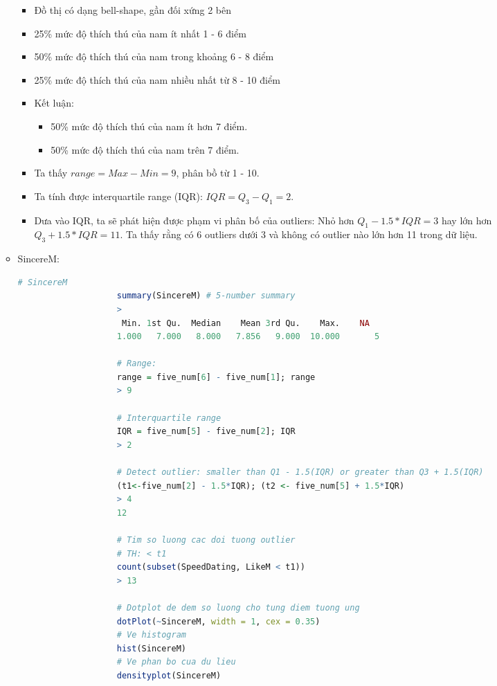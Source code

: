 \documentclass[a4paper,12pt]{article}
\begin{document}
\begin{enumerate}[label = {\alph*)}]
\begin{itemize}
					\begin{itemize}
						\item Đồ thị có dạng bell-shape, gần đối xứng 2 bên
						\item 25\% mức độ thích thú của nam ít nhất 1 - 6 điểm 
						\item 50\% mức độ thích thú của nam trong khoảng 6 - 8 điểm
						\item 25\% mức độ thích thú của nam nhiều nhất từ 8 - 10 điểm
						\item Kết luận:
						\begin{itemize}
							\item 50\% mức độ thích thú của nam ít hơn 7 điểm.
							\item 50\% mức độ thích thú của nam trên 7 điểm.
						\end{itemize}
						\item Ta thấy $range = Max - Min = 9$, phân bồ từ 1 - 10.
						\item Ta tính được interquartile range (IQR): $IQR = Q_3 - Q_1 = 2$.
						\item Dưa vào IQR, ta sẽ phát hiện được phạm vi phân bố của outliers:
						Nhỏ hơn $Q_1 - 1.5*IQR = 3$ hay lớn hơn $Q_3 + 1.5*IQR = 11$. Ta thấy rằng có 6 outliers dưới 3 và không có outlier nào lớn hơn 11 trong dữ liệu.
					\end{itemize}
					
					
					
				\item SincereM:
					\begin{lstlisting}[language = R]
					# SincereM
					summary(SincereM) # 5-number summary
					>
					 Min. 1st Qu.  Median    Mean 3rd Qu.    Max.    NA 
					1.000   7.000   8.000   7.856   9.000  10.000       5
					
					# Range:
					range = five_num[6] - five_num[1]; range
					> 9
					
					# Interquartile range
					IQR = five_num[5] - five_num[2]; IQR
					> 2
					
					# Detect outlier: smaller than Q1 - 1.5(IQR) or greater than Q3 + 1.5(IQR)
					(t1<-five_num[2] - 1.5*IQR); (t2 <- five_num[5] + 1.5*IQR)
					> 4
					12
					
					# Tim so luong cac doi tuong outlier
					# TH: < t1
					count(subset(SpeedDating, LikeM < t1))
					> 13
					
					# Dotplot de dem so luong cho tung diem tuong ung
					dotPlot(~SincereM, width = 1, cex = 0.35)
					# Ve histogram
					hist(SincereM)
					# Ve phan bo cua du lieu
					densityplot(SincereM)
					\end{lstlisting}
					

\end{itemize}
\end{enumerate}
\end{document}
